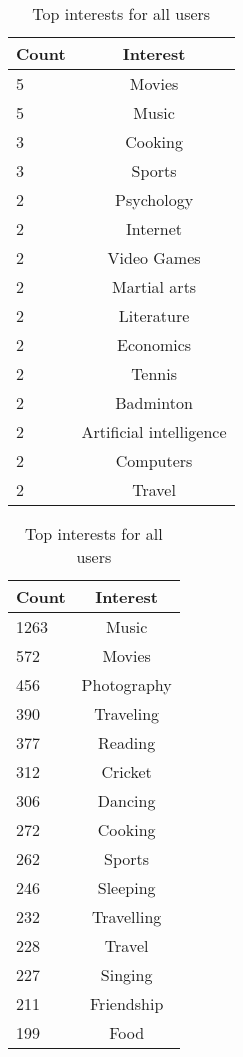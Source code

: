 \begin{table}[h]
\begin{minipage}[b]{.50\textwidth}
\centering
  \begin{tabular}{|l|c|} %
  \hline
  	\textbf{Count} & \textbf{Interest} \\ \hline
		5 & Movies \\ \hline
		5 & Music \\ \hline
		3 & Cooking \\ \hline
		3 & Sports \\ \hline
		2 & Psychology \\ \hline
		2 & Internet \\ \hline
		2 & Video Games \\ \hline
		2 & Martial arts \\ \hline
		2 & Literature \\ \hline
		2 & Economics \\ \hline
		2 & Tennis \\ \hline
		2 & Badminton \\ \hline
		2 & Artificial intelligence \\ \hline
		2 & Computers \\ \hline
		2 & Travel \\ \hline
  \end{tabular}
  \caption{Top interests for app users}
\end{minipage}
\begin{minipage}[b]{.50\textwidth}
\centering
  \begin{tabular}{|l|c|} %
  \hline
  		\textbf{Count} & \textbf{Interest} \\ \hline
		1263 & Music \\ \hline
		572 & Movies \\ \hline
		456 & Photography \\ \hline
		390 & Traveling \\ \hline
		377 & Reading \\ \hline
		312 & Cricket \\ \hline
		306 & Dancing \\ \hline
		272 & Cooking \\ \hline
		262 & Sports \\ \hline
		246 & Sleeping \\ \hline
		232 & Travelling \\ \hline
		228 & Travel \\ \hline
		227 & Singing \\ \hline
		211 & Friendship \\ \hline
		199 & Food \\ \hline
  \end{tabular}
  \caption{Top interests for all users}
\end{minipage}
\end{table}



